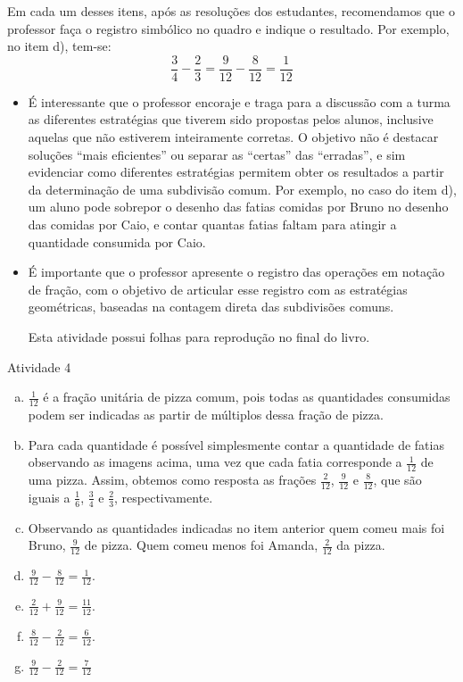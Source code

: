 Em cada um desses itens, após as resoluções dos estudantes, recomendamos que o professor faça o registro simbólico no quadro e indique o resultado. Por exemplo, no item d), tem-se:
$$\frac{3}{4} - \frac{2}{3} = \frac{9}{12} - \frac{8}{12}=\frac{1}{12}$$
\begin{itemize}
  \item   É interessante que o professor encoraje e traga para a discussão com a turma as diferentes estratégias que tiverem sido propostas pelos alunos, inclusive aquelas que não estiverem inteiramente corretas. O objetivo não é destacar soluções ``mais eficientes'' ou separar as ``certas'' das ``erradas'', e sim evidenciar como diferentes estratégias permitem obter os resultados a partir da determinação de uma subdivisão comum. Por exemplo, no caso do item d), um aluno pode sobrepor o desenho das fatias comidas por Bruno no desenho das comidas por Caio, e contar quantas fatias faltam para atingir a quantidade consumida por Caio.
  \item  É importante que o professor apresente o registro das operações em notação de fração, com o objetivo de articular esse registro com as estratégias geométricas, baseadas na contagem direta das subdivisões comuns.

Esta atividade possui folhas para reprodução no final do livro.
\end{itemize} %

\begin{resposta*}{Atividade 4}
  \begin{enumerate}[a)]
   \item $\frac{1}{12}$ é a fração unitária de pizza comum, pois todas as quantidades consumidas podem ser indicadas as partir de múltiplos dessa fração de pizza.
   \item Para cada quantidade é possível simplesmente contar a quantidade de fatias observando as imagens acima, uma vez que cada fatia corresponde a $\frac{1}{12}$ de uma pizza. Assim, obtemos como resposta as frações $\frac{2}{12}$, $\frac{9}{12}$ e $\frac{8}{12}$, que são iguais a $\frac{1}{6}$, $\frac{3}{4}$ e $\frac{2}{3}$, respectivamente.
   \item  Observando as quantidades indicadas no item anterior quem comeu mais foi Bruno, $\frac{9}{12}$ de pizza. Quem comeu menos foi Amanda, $\frac{2}{12}$ da pizza.
   \item  $\frac{9}{12} -  \frac{8}{12} = \frac{1}{12}$.
   \item  $\frac{2}{12} +  \frac{9}{12} = \frac{11}{12}$.
   \item  $\frac{8}{12} -  \frac{2}{12} = \frac{6}{12}$.
   \item  $\frac{9}{12} -  \frac{2}{12} = \frac{7}{12}$
  \end{enumerate}

\end{resposta*}

